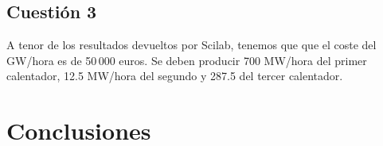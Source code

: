 \documentclass[12pt,a4paper,twoside,openright,titlepage,final]{article}
\begin{document}
\subsection{Cuestión 3}

A tenor de los resultados devueltos por Scilab, tenemos que que el coste del GW/hora es de 50\,000 euros. Se deben producir 700 MW/hora del primer calentador, 12.5 MW/hora del segundo y 287.5 del tercer calentador.\\



\section{Conclusiones}
\end{document}

